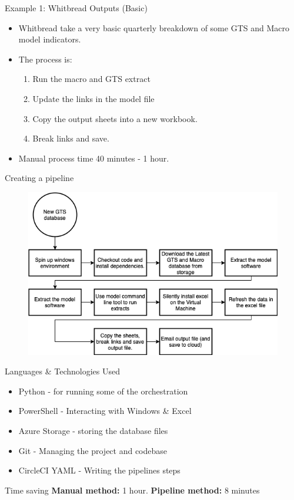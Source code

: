 \documentclass[aspectratio=169]{beamer}
\begin{document}
\begin{frame}{Example 1: Whitbread Outputs (Basic)}

\begin{itemize}
	\item Whitbread take a very basic quarterly breakdown of some GTS and Macro model indicators.
	\item The process is:
	\begin{enumerate}
		\item Run the macro and GTS extract
		\item Update the links in the model file
		\item Copy the output sheets into a new workbook. 
		\item Break links and save.
	\end{enumerate}
	\item Manual process time 40 minutes - 1 hour.
\end{itemize}
\end{frame}

\begin{frame}{Creating a pipeline}

\begin{figure}
\centering
	\includegraphics[width=0.7\linewidth]{graphics/WhitbreadPipeline.png}
\end{figure}	


\end{frame}



\begin{frame}{Languages \& Technologies Used}

\begin{itemize}
	\item Python - for running some of the orchestration
	\item PowerShell - Interacting with Windows \& Excel
	\item Azure Storage - storing the database files
	\item Git - Managing the project and codebase
	\item CircleCI YAML - Writing the pipelines steps
\end{itemize}	

\begin{block}{Time saving}
	\textbf{Manual method:} 1 hour. \newline
	\textbf{Pipeline method:} 8 minutes
\end{block}


\end{frame}
\end{document}
